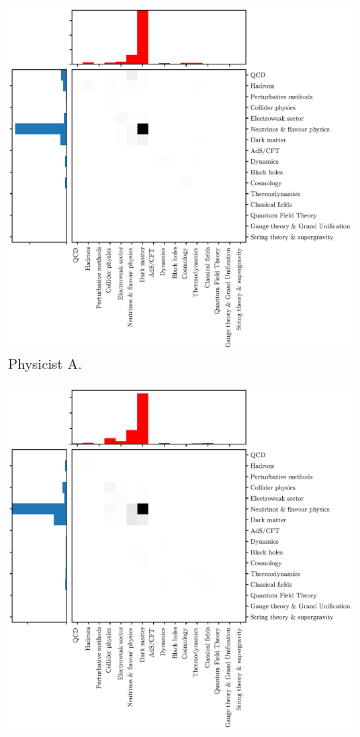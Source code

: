 \documentclass{article}
\begin{document}
\begin{figure}[h]
\begin{subfigure}{.45\textwidth}
    \includegraphics[width=1.15\textwidth]{plots/trajectory_example_S.Ando.1.eps}
    \caption{Physicist A. %
    }
    \label{fig:S.Ando.1}
\end{subfigure}\hfill%
\begin{subfigure}{0.45\textwidth}
    \includegraphics[width=1.15\textwidth]{plots/trajectory_example_J.F.Beacom.1.eps}

\end{subfigure}
\end{figure}
\end{document}
